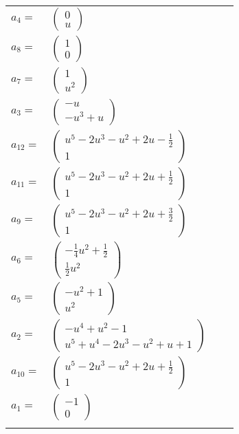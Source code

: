 \documentclass[1p]{elsarticle_modified}
\theoremstyle{definition}
\begin{document}
\begin{tabular}{m{7pt} m{180pt} m{7pt} m{180pt} }
\flushright $a_{4}=$&$\begin{pmatrix}0\\u\end{pmatrix}$ \\
\flushright $a_{8}=$&$\begin{pmatrix}1\\0\end{pmatrix}$ \\
\flushright $a_{7}=$&$\begin{pmatrix}1\\u^2\end{pmatrix}$ \\
\flushright $a_{3}=$&$\begin{pmatrix}- u\\- u^3+u\end{pmatrix}$ \\
\flushright $a_{12}=$&$\begin{pmatrix}u^5-2 u^3- u^2+2 u-\frac{1}{2}\\1\end{pmatrix}$ \\
\flushright $a_{11}=$&$\begin{pmatrix}u^5-2 u^3- u^2+2 u+\frac{1}{2}\\1\end{pmatrix}$ \\
\flushright $a_{9}=$&$\begin{pmatrix}u^5-2 u^3- u^2+2 u+\frac{3}{2}\\1\end{pmatrix}$ \\
\flushright $a_{6}=$&$\begin{pmatrix}-\frac{1}{4} u^2+\frac{1}{2}\\\frac{1}{2} u^2\end{pmatrix}$ \\
\flushright $a_{5}=$&$\begin{pmatrix}- u^2+1\\u^2\end{pmatrix}$ \\
\flushright $a_{2}=$&$\begin{pmatrix}- u^4+u^2-1\\u^5+u^4-2 u^3- u^2+u+1\end{pmatrix}$ \\
\flushright $a_{10}=$&$\begin{pmatrix}u^5-2 u^3- u^2+2 u+\frac{1}{2}\\1\end{pmatrix}$ \\
\flushright $a_{1}=$&$\begin{pmatrix}-1\\0\end{pmatrix}$\\&\end{tabular}
\end{document}
